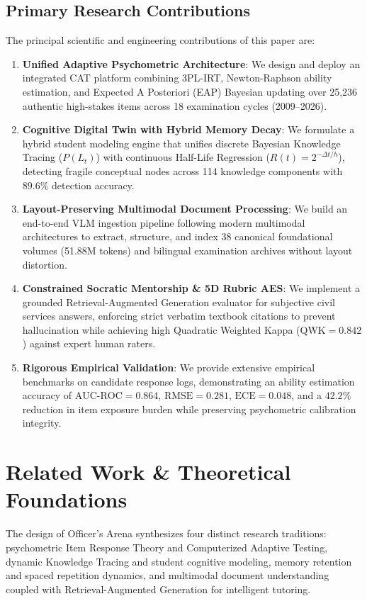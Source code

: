 \documentclass[conference]{IEEEtran}
\begin{document}
\subsection{Primary Research Contributions}
The principal scientific and engineering contributions of this paper are:
\begin{enumerate}[leftmargin=*]
    \item \textbf{Unified Adaptive Psychometric Architecture}: We design and deploy an integrated CAT platform combining 3PL-IRT, Newton-Raphson ability estimation, and Expected A Posteriori (EAP) Bayesian updating over 25,236 authentic high-stakes items across 18 examination cycles (2009--2026).
    \item \textbf{Cognitive Digital Twin with Hybrid Memory Decay}: We formulate a hybrid student modeling engine that unifies discrete Bayesian Knowledge Tracing ($P(L_t)$) with continuous Half-Life Regression ($R(t) = 2^{-\Delta t / h}$), detecting fragile conceptual nodes across 114 knowledge components with $89.6\%$ detection accuracy.
    \item \textbf{Layout-Preserving Multimodal Document Processing}: We build an end-to-end VLM ingestion pipeline following modern multimodal architectures \cite{Wang2024,Poznanski2025,Zhang2024} to extract, structure, and index 38 canonical foundational volumes (51.88M tokens) and bilingual examination archives without layout distortion.
    \item \textbf{Constrained Socratic Mentorship \& 5D Rubric AES}: We implement a grounded Retrieval-Augmented Generation evaluator for subjective civil services answers, enforcing strict verbatim textbook citations to prevent hallucination while achieving high Quadratic Weighted Kappa ($\text{QWK} = 0.842$) against expert human raters.
    \item \textbf{Rigorous Empirical Validation}: We provide extensive empirical benchmarks on candidate response logs, demonstrating an ability estimation accuracy of $\text{AUC-ROC} = 0.864$, $\text{RMSE} = 0.281$, $\text{ECE} = 0.048$, and a $42.2\%$ reduction in item exposure burden while preserving psychometric calibration integrity.
\end{enumerate}

\section{Related Work \& Theoretical Foundations}
The design of Officer's Arena synthesizes four distinct research traditions: psychometric Item Response Theory and Computerized Adaptive Testing, dynamic Knowledge Tracing and student cognitive modeling, memory retention and spaced repetition dynamics, and multimodal document understanding coupled with Retrieval-Augmented Generation for intelligent tutoring.
\end{document}

